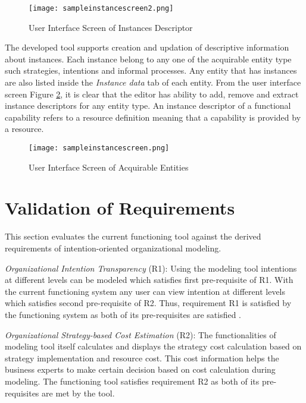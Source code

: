 \begin{figure}
	\centering
	\texttt{[image: sampleinstancescreen2.png]}
	\caption{User Interface Screen of Instances Descriptor}
	\label{fig:realizationofinstances2}
\end{figure}

The developed tool supports creation and updation of descriptive information about instances. Each instance belong to any one of the acquirable entity type such strategies, intentions and informal processes. Any entity that has instances are also listed inside the \textit{Instance data} tab of each entity. From the user interface screen Figure \ref{fig:realizationofinstances}, it is clear that the editor has ability to add, remove and extract instance descriptors for any entity type. An instance descriptor of a functional capability refers to a resource definition meaning that a capability is provided by a resource.
 
\begin{figure}
	\centering
	\texttt{[image: sampleinstancescreen.png]}
	\caption{User Interface Screen of Acquirable Entities}
	\label{fig:realizationofinstances}
\end{figure}

		
\section{Validation of Requirements}
\label{sec:validation}
This section evaluates the current functioning tool against the derived requirements of intention-oriented organizational modeling. 

\textit{Organizational Intention Transparency} (R1):  Using the modeling tool intentions at different levels can be modeled which satisfies first pre-requisite of R1. With the current functioning system any user can view intention at different levels which satisfies second pre-requisite of R2. Thus, requirement R1 is satisfied by the functioning system as both of its pre-requisites are satisfied .

\textit{Organizational Strategy-based Cost Estimation} (R2): The functionalities of modeling tool itself calculates and displays the strategy cost calculation based on strategy implementation and resource cost. This cost information helps the business experts to make certain decision based on cost calculation during modeling. The functioning tool satisfies requirement R2 as both of its pre-requisites are met by the tool. 

